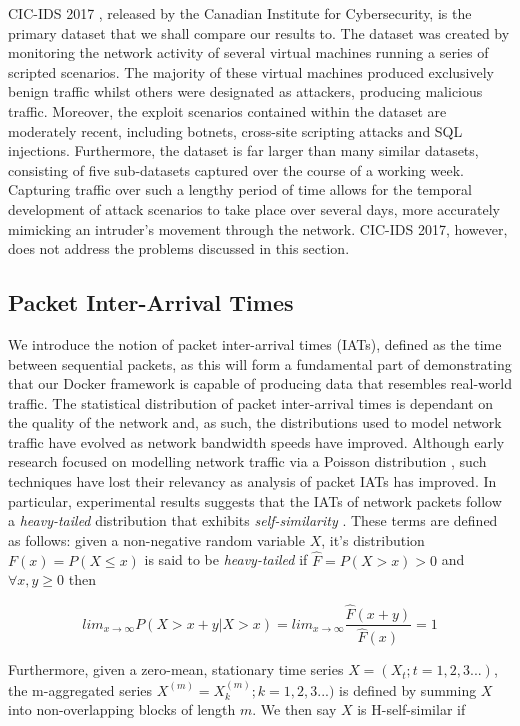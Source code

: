 \documentclass[msc,deptreport, cs]{infthesis} %
\begin{document}
CIC-IDS 2017 \cite{sharafaldin2018toward}, released by the Canadian Institute for Cybersecurity, is the primary dataset that we shall compare our results to. The dataset was created by monitoring the network activity of several virtual machines running a series of scripted scenarios. The majority of these virtual machines produced exclusively benign traffic whilst others were designated as attackers, producing malicious traffic. Moreover, the exploit scenarios contained within the dataset are moderately recent, including botnets, cross-site scripting attacks and SQL injections. Furthermore, the dataset is far larger than many similar datasets, consisting of five sub-datasets captured over the course of a working week. Capturing traffic over such a lengthy period of time allows for the temporal development of attack scenarios to take place over several days, more accurately mimicking an intruder's movement through the network. CIC-IDS 2017, however, does not address the problems discussed in this section.


\subsection{Packet Inter-Arrival Times}
\label{sec:IATs}
We introduce the notion of packet inter-arrival times (IATs), defined as the time between sequential packets, as this will form a fundamental part of demonstrating that our Docker framework is capable of producing data that resembles real-world traffic.  The statistical distribution of packet inter-arrival times is dependant on the quality of the network and, as such, the distributions used to model network traffic have evolved as network bandwidth speeds have improved. Although early research focused on modelling network traffic via a Poisson distribution \cite{frost1994traffic} , such techniques have lost their relevancy as analysis of packet IATs has improved. In particular, experimental results suggests that the IATs of network packets follow a \textit{heavy-tailed} distribution that exhibits \textit{self-similarity} \cite{feldmann2000characteristics}. These terms are defined as follows: given a non-negative random variable $X$, it's distribution $F(x) = P(X \leq x)$ is said to be \textit{heavy-tailed} if $\hat{F} = P(X > x)> 0$ and $\forall x, y \geq 0$ then 

$$lim_{x \rightarrow \infty} P(X > x + y | X > x) = lim_{x \rightarrow \infty} \frac{\hat{F}(x + y)}{\hat{F}(x)} = 1 $$ 

Furthermore, given a zero-mean, stationary time series $X = (X_t; t = 1, 2, 3 ...)$, the m-aggregated series $X^{(m)} = X^{(m)}_k; k = 1, 2,  3 ...)$ is defined by summing $X$ into non-overlapping blocks of length $m$. We then say $X$ is H-self-similar if
\end{document}
